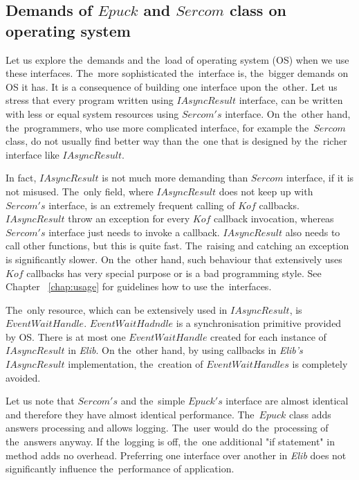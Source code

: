   \subsection*{Demands of $Epuck$ and $Sercom$ class on operating system} 
  Let us explore the~demands and the~load of operating system (OS) when we use these interfaces.
  The~more sophisticated the~interface is, the~bigger demands on OS it has.
  It is a consequence of building one interface upon the~other.
  Let us stress that every program written using $IAsyncResult$ interface, 
  can be written with less or equal system resources using $Sercom's$
  interface. On the~other hand, the~programmers, 
  who use more complicated interface, for example the~$Sercom$ class, do not usually find better way 
  than the~one that is designed by the~richer interface like $IAsyncResult$.

  In fact, $IAsyncResult$ is not much more demanding than $Sercom$ interface, if it is not misused.
  The~only field, where $IAsyncResult$ does not keep up with $Sercom's$ interface, 
  is an extremely frequent calling of $Kof$ callbacks.
  $IAsyncResult$ throw an exception for every $Kof$ callback invocation, 
  whereas $Sercom's$ interface just needs to invoke a callback.
  $IAsyncResult$ also needs to call other functions, but this is quite fast. 
  The~raising and catching an exception is significantly slower.
  On the~other hand, such behaviour that extensively uses $Kof$ callbacks 
  has very special purpose or is a bad programming style.
  See Chapter ~\ref{chap:usage} for guidelines how to use the~interfaces.

  The~only resource, which can be extensively used in $IAsyncResult$, is $EventWaitHandle$. 
  $EventWaitHadndle$ is a synchronisation primitive provided
  by OS. There is at most one $EventWaitHandle$ created for each instance of $IAsyncResult$ in {\it Elib}. 
  On the~other hand, by using callbacks in {\it Elib's} $IAsyncResult$
  implementation, the~creation of $EventWaitHandles$ is completely avoided.

  Let us note that $Sercom's$ and the~simple $Epuck's$ interface 
  are almost identical and therefore they have almost identical performance.
  The~$Epuck$ class adds answers processing and allows logging. 
  The~user would do the~processing of the~answers anyway.
  If the~logging is off, the~one additional "if statement" in method adds no overhead. 
  Preferring one interface over another in {\it Elib} does not significantly influence the~performance of application.


